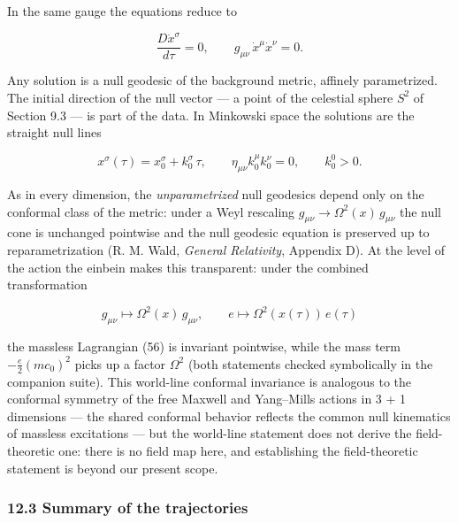 \documentclass[
]{article}
\begin{document}
In the same gauge the equations reduce to

\[\frac{D \dot{x}^{\sigma}}{d\tau} = 0, \qquad g_{\mu\nu}\, \dot{x}^{\mu} \dot{x}^{\nu} = 0. \tag{77}\]

Any solution is a null geodesic of the background metric, affinely
parametrized. The initial direction of the null vector --- a point of
the celestial sphere \(S^{2}\) of Section 9.3 --- is part of the data.
In Minkowski space the solutions are the straight null lines

\[x^{\sigma}(\tau) = x^{\sigma}_{0} + k^{\sigma}_{0}\, \tau, \qquad \eta_{\mu\nu} k^{\mu}_{0} k^{\nu}_{0} = 0, \qquad k^{0}_{0} > 0. \tag{78}\]

As in every dimension, the \emph{unparametrized} null geodesics depend
only on the conformal class of the metric: under a Weyl rescaling
\(g_{\mu\nu} \to \Omega^{2}(x)\, g_{\mu\nu}\) the null cone is unchanged
pointwise and the null geodesic equation is preserved up to
reparametrization (R. M. Wald, \emph{General Relativity}, Appendix D).
At the level of the action the einbein makes this transparent: under the
combined transformation

\[g_{\mu\nu} \longmapsto \Omega^{2}(x)\, g_{\mu\nu}, \qquad e \longmapsto \Omega^{2}(x(\tau))\, e(\tau) \tag{79}\]

the massless Lagrangian (56) is invariant pointwise, while the mass term
\(-\frac{e}{2}(mc_{0})^{2}\) picks up a factor \(\Omega^{2}\) (both
statements checked symbolically in the companion suite). This world-line
conformal invariance is analogous to the conformal symmetry of the free
Maxwell and Yang--Mills actions in 3 + 1 dimensions --- the shared
conformal behavior reflects the common null kinematics of massless
excitations --- but the world-line statement does not derive the
field-theoretic one: there is no field map here, and establishing the
field-theoretic statement is beyond our present scope.

\hypertarget{summary-of-the-trajectories}{%
\subsubsection{12.3 Summary of the
trajectories}\label{summary-of-the-trajectories}}
\end{document}
